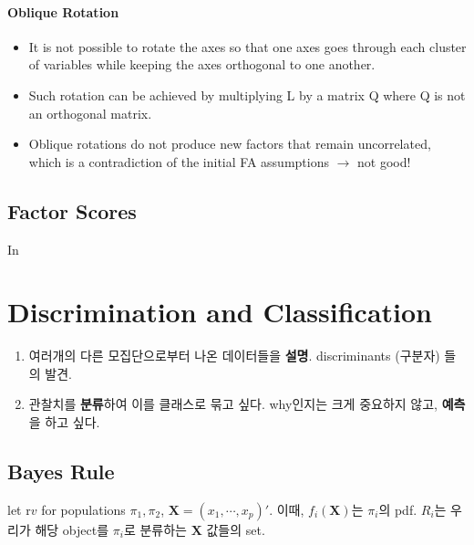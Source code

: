 \documentclass[
]{book}
\providecommand{\tightlist}{%
  \setlength{\itemsep}{0pt}\setlength{\parskip}{0pt}}
\begin{document}
{{{\hypertarget{oblique-rotation}{%
\paragraph{Oblique Rotation}\label{oblique-rotation}}

\begin{itemize}
\tightlist
\item
  It is not possible to rotate the axes so that one axes goes through each cluster of variables while keeping the axes orthogonal to one another.
\item
  Such rotation can be achieved by multiplying L by a matrix Q where Q is not an orthogonal matrix.
\item
  Oblique rotations do not produce new factors that remain uncorrelated, which is a contradiction of the initial FA assumptions \(\rightarrow\) not good!
\end{itemize}

\hypertarget{factor-scores}{%
\subsection{Factor Scores}\label{factor-scores}}

In

\hypertarget{discrimination-and-classification}{%
\section{Discrimination and Classification}\label{discrimination-and-classification}}

\begin{enumerate}
\def\labelenumi{\arabic{enumi}.}
\tightlist
\item
  여러개의 다른 모집단으로부터 나온 데이터들을 \textbf{설명}. discriminants (구분자) 들의 발견.
\item
  관찰치를 \textbf{분류}하여 이를 클래스로 묶고 싶다. why인지는 크게 중요하지 않고, \textbf{예측}을 하고 싶다.
\end{enumerate}

\hypertarget{bayes-rule}{%
\subsection{Bayes Rule}\label{bayes-rule}}

let r\(v\) for populations \(\pi_1 , \pi_2\), \(\pmb X = (x_1 , \cdots, x_p)'\). 이때, \(f_i(\pmb X)\)는 \(\pi_i\)의 pdf. \(R_i\)는 우리가 해당 object를 \(\pi_i\)로 분류하는 \(\pmb X\) 값들의 set.

}}}
\end{document}
